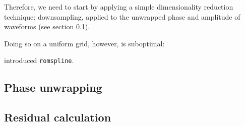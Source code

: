 \documentclass[main.tex]{subfiles}
\begin{document}
Therefore, we need to start by applying a simple dimensionality reduction technique: downsampling, applied to the unwrapped phase and amplitude of waveforms (see section \ref{sec:unwrapping}).

Doing so on a uniform grid, however, is suboptimal: 

\textcite{galleyFastEfficientEvaluation2016} introduced \texttt{romspline}. 


\subsection{Phase unwrapping} \label{sec:unwrapping}

\subsection{Residual calculation} \label{sec:residuals}



\subsection{}



\end{document}
